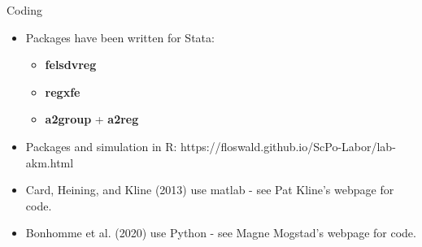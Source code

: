 \documentclass[notes=show]{beamer}
\begin{document}
\begin{frame}{Coding}
\begin{itemize}
\item Packages have been written for Stata:
\begin{itemize} \smallskip
    \item \textbf{felsdvreg} \smallskip
    \item \textbf{regxfe} \smallskip
     \item \textbf{a2group} + \textbf{a2reg}
\end{itemize} \smallskip
\item Packages and simulation in R: 
 https://floswald.github.io/ScPo-Labor/lab-akm.html \medskip
\item Card, Heining, and Kline (2013) use matlab - see Pat Kline's webpage for code. \medskip
\item Bonhomme et al. (2020) use Python - see Magne Mogstad's webpage for code.
\end{itemize}
\end{frame}
\end{document}

